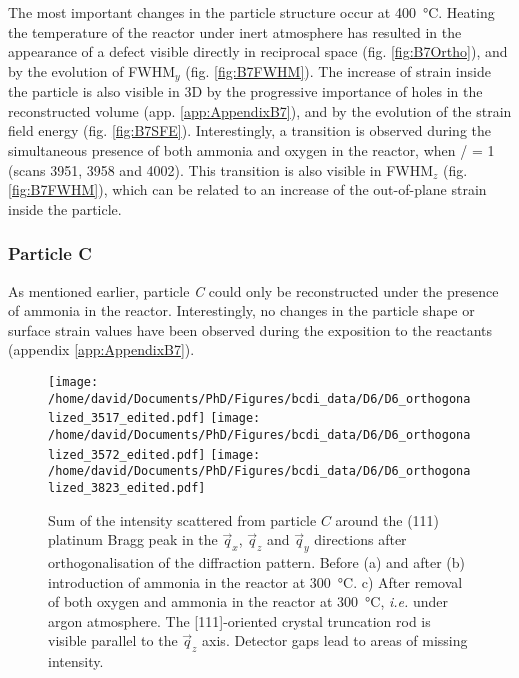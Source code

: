 The most important changes in the particle structure occur at \qty{400}{\degreeCelsius}.
Heating the temperature of the reactor under inert atmosphere has resulted in the appearance of a defect visible directly in reciprocal space (fig. \ref{fig:B7Ortho}), and by the evolution of FWHM$_y$ (fig. \ref{fig:B7FWHM}).
The increase of strain inside the particle is also visible in 3D by the progressive importance of holes in the reconstructed volume (app. \ref{app:AppendixB7}), and by the evolution of the strain field energy (fig. \ref{fig:B7SFE}).
Interestingly, a transition is observed during the simultaneous presence of both ammonia and oxygen in the reactor, when / = 1 (scans 3951, 3958 and 4002).
This transition is also visible in FWHM$_z$ (fig. \ref{fig:B7FWHM}), which can be related to an increase of the out-of-plane strain inside the particle.

\subsubsection{Particle C}

As mentioned earlier, particle \textit{C} could only be reconstructed under the presence of ammonia in the reactor.
Interestingly, no changes in the particle shape or surface strain values have been observed during the exposition to the reactants (appendix \ref{app:AppendixB7}).

\begin{figure}[!htb]
    \centering
    \texttt{[image: /home/david/Documents/PhD/Figures/bcdi\_data/D6/D6\_orthogonalized\_3517\_edited.pdf]}
    \texttt{[image: /home/david/Documents/PhD/Figures/bcdi\_data/D6/D6\_orthogonalized\_3572\_edited.pdf]}
    \texttt{[image: /home/david/Documents/PhD/Figures/bcdi\_data/D6/D6\_orthogonalized\_3823\_edited.pdf]}
    \caption{
        Sum of the intensity scattered from particle $C$ around the (111) platinum Bragg peak in the $\vec{q}_x$, $\vec{q}_z$ and $\vec{q}_y$ directions after orthogonalisation of the diffraction pattern.
        Before (a) and after (b) introduction of ammonia in the reactor at \qty{300}{\degreeCelsius}.
        c) After removal of both oxygen and ammonia in the reactor at \qty{300}{\degreeCelsius}, \textit{i.e.} under argon atmosphere.
        The [111]-oriented crystal truncation rod is visible parallel to the $\vec{q}_z$ axis.
        Detector gaps lead to areas of missing intensity.
    }
    \label{fig:D6Ortho}
\end{figure}

